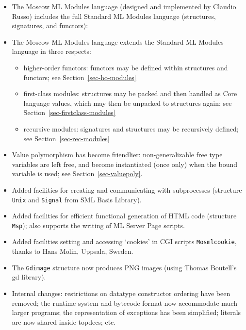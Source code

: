 \documentclass[fleqn]{article}
\begin{document}
\begin{itemize}
\item The Moscow ML Modules language (designed and implemented by
  Claudio Russo) includes the full Standard ML Modules language
  (structures, signatures, and functors):
\item The Moscow ML Modules language extends the Standard ML Modules
  language in three respects:
  \begin{itemize}
  \item higher-order functors: functors may be defined within
    structures and functors; see Section~\ref{sec-ho-modules}
  \item first-class modules: structures may be packed and then handled
    as Core language values, which may then be unpacked to structures
    again; see Section~\ref{sec-firstclass-modules}
  \item recursive modules: signatures and structures may be
    recursively defined; see Section~\ref{sec-rec-modules}
  \end{itemize}
\item Value polymorphism has become friendlier: non-generalizable free
  type variables are left free, and become instantiated (once only)
  when the bound variable is used; see Section~\ref{sec-valuepoly}.
\item Added facilities for creating and communicating with
  subprocesses (structure \texttt{Unix} and \texttt{Signal} from SML
  Basis Library).
\item Added facilities for efficient functional generation of HTML
  code (structure \texttt{Msp}); also supports the writing of ML
  Server Page scripts.
\item Added facilities setting and accessing `cookies' in CGI scripts
  \texttt{Mosmlcookie}, thanks to Hans Molin, Uppsala, Sweden.
\item The \texttt{Gdimage} structure now produces PNG images (using
  Thomas Boutell's gd library).
\item Internal changes: restrictions on datatype constructor ordering
  have been removed; the runtime system and bytecode format now
  accommodate much larger programs; the representation of exceptions
  has been simplified; literals are now shared inside topdecs; etc.
\end{itemize}

\end{document}
